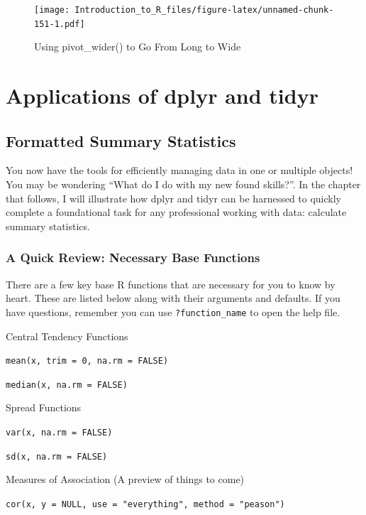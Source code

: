 \documentclass[]{book}
\theoremstyle{definition}
\theoremstyle{definition}
\theoremstyle{definition}
\theoremstyle{remark}
\begin{document}
\begin{figure}
\centering
\texttt{[image: Introduction\_to\_R\_files/figure-latex/unnamed-chunk-151-1.pdf]}
\caption{\label{fig:unnamed-chunk-151}Using pivot\_wider() to Go From Long to Wide}
\end{figure}

\hypertarget{part-applications-of-dplyr-and-tidyr}{%
\part{Applications of dplyr and tidyr}\label{part-applications-of-dplyr-and-tidyr}}

\hypertarget{formatted-summary-statistics}{%
\chapter{Formatted Summary Statistics}\label{formatted-summary-statistics}}

You now have the tools for efficiently managing data in one or multiple objects! You may be wondering ``What do I do with my new found skills?''. In the chapter that follows, I will illustrate how dplyr and tidyr can be harnessed to quickly complete a foundational task for any professional working with data: calculate summary statistics.

\hypertarget{a-quick-review-necessary-base-functions}{%
\section{A Quick Review: Necessary Base Functions}\label{a-quick-review-necessary-base-functions}}

There are a few key base R functions that are necessary for you to know by heart. These are listed below along with their arguments and defaults. If you have questions, remember you can use \texttt{?function\_name} to open the help file.

Central Tendency Functions

\texttt{mean(x,\ trim\ =\ 0,\ na.rm\ =\ FALSE)}

\texttt{median(x,\ na.rm\ =\ FALSE)}

Spread Functions

\texttt{var(x,\ na.rm\ =\ FALSE)}

\texttt{sd(x,\ na.rm\ =\ FALSE)}

Measures of Association (A preview of things to come)

\texttt{cor(x,\ y\ =\ NULL,\ use\ =\ "everything",\ method\ =\ "peason")}
\end{document}
